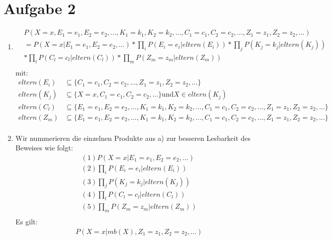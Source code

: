 \documentclass[a4paper,10pt]{article}
\begin{document}
\section*{Aufgabe 2}
	\begin{enumerate}[~~a.)]
	 \item
		\begin{align*}
			&P(X=x, E_{1} = e_{1}, E_{2} = e_{2}, ... , K_{1} = k_{1}, K_{2} = k_{2}, ... , C_{1} = c_{1}, C_{2} = c_{2}, ... , Z_{1} = z_{1}, Z_{2} = z_{2}, ...) \\
			&= P(X=x | E_{1} = e_{1}, E_{2} = e_{2}, ...) *
			\prod_{i} P(E_{i}=e_{i} | eltern(E_{i})) *
			\prod_{j} P(K_{j}=k_{j} | eltern(K_{j})) \\
			&* \prod_{l} P(C_{l}=c_{l} | eltern(C_{l})) *
			\prod_{m} P(Z_{m}=z_{m} | eltern(Z_{m}))\\
		\end{align*}
	 	mit:
	 	\begin{align*}
			eltern(E_{i}) &\subseteq \{C_{1} = c_{1}, C_{2} = c_{2}, ... , Z_{1} = z_{1}, Z_{2} = z_{2}, ...\} \\
			eltern(K_{j}) &\subseteq \{X = x, C_{1} = c_{1}, C_{2} = c_{2}, ...\} \text{und} X \in eltern(K_{j}) \\
			eltern(C_{l}) &\subseteq \{E_{1} = e_{1}, E_{2} = e_{2}, ... , K_{1} = k_{1}, K_{2} = k_{2}, ... , C_{1} = c_{1}, C_{2} = c_{2}, ... , Z_{1} = z_{1}, Z_{2} = z_{2}, ...\} \\
			eltern(Z_{m}) &\subseteq \{E_{1} = e_{1}, E_{2} = e_{2}, ... , K_{1} = k_{1}, K_{2} = k_{2}, ... , C_{1} = c_{1}, C_{2} = c_{2}, ... , Z_{1} = z_{1}, Z_{2} = z_{2}, ...\} \\
		\end{align*}	
	 \item
	 Wir nummerieren die einzelnen Produkte aus a) zur besseren Lesbarkeit des Beweises wie folgt:
	 \begin{align*}
	 	&(1) P(X=x | E_{1} = e_{1}, E_{2} = e_{2}, ...) \\
	 	&(2) \prod_{i} P(E_{i}=e_{i} | eltern(E_{i})) \\
	 	&(3) \prod_{j} P(K_{j}=k_{j} | eltern(K_{j}))\\
	 	&(4) \prod_{l} P(C_{l}=c_{l} | eltern(C_{l}))\\
	 	&(5) \prod_{m} P(Z_{m}=z_{m} | eltern(Z_{m}))\\
	 \end{align*}
	 	Es gilt:
	 	\begin{align*}
	 	&P(X=x | mb(X), Z_{1} = z_{1}, Z_{2} = z_{2}, ...) \\

\end{align*}
\end{enumerate}
\end{document}
